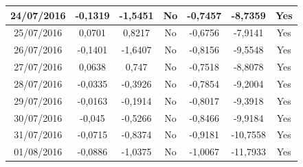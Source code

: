 \documentclass[11pt]{report}
\begin{document}
\begin{table}[]
\begin{tabular}{c|c|c|c|c|c|c|}
\multicolumn{1}{|c|}{24/07/2016}          & -0,1319         & -1,5451         & No               & -0,7457          & -8,7359          & Yes              \\ \hline
\multicolumn{1}{|c|}{25/07/2016}          & 0,0701          & 0,8217          & No               & -0,6756          & -7,9141          & Yes              \\ \hline
\multicolumn{1}{|c|}{26/07/2016}          & -0,1401         & -1,6407         & No               & -0,8156          & -9,5548          & Yes              \\ \hline
\multicolumn{1}{|c|}{27/07/2016}          & 0,0638          & 0,747           & No               & -0,7518          & -8,8078          & Yes              \\ \hline
\multicolumn{1}{|c|}{28/07/2016}          & -0,0335         & -0,3926         & No               & -0,7854          & -9,2004          & Yes              \\ \hline
\multicolumn{1}{|c|}{29/07/2016}          & -0,0163         & -0,1914         & No               & -0,8017          & -9,3918          & Yes              \\ \hline
\multicolumn{1}{|c|}{30/07/2016}          & -0,045          & -0,5266         & No               & -0,8466          & -9,9184          & Yes              \\ \hline
\multicolumn{1}{|c|}{31/07/2016}          & -0,0715         & -0,8374         & No               & -0,9181          & -10,7558         & Yes              \\ \hline
\multicolumn{1}{|c|}{01/08/2016}          & -0,0886         & -1,0375         & No               & -1,0067          & -11,7933         & Yes              \\ \hline
\end{tabular}
\end{table}
\end{document}
